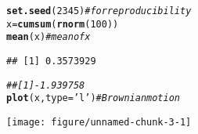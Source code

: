 \documentclass[12pt,ngerman]{scrartcl}\usepackage[]{graphicx}\usepackage[]{xcolor}
\makeatletter
\def\maxwidth{ %
  \ifdim\Gin@nat@width>\linewidth
    \linewidth
  \else
    \Gin@nat@width
  \fi
}
\newcommand{\hlnum}[1]{\textcolor[rgb]{0.686,0.059,0.569}{#1}}%
\newcommand{\hlstr}[1]{\textcolor[rgb]{0.192,0.494,0.8}{#1}}%
\newcommand{\hlcom}[1]{\textcolor[rgb]{0.678,0.584,0.686}{\textit{#1}}}%
\newcommand{\hlstd}[1]{\textcolor[rgb]{0.345,0.345,0.345}{#1}}%
\newcommand{\hlkwb}[1]{\textcolor[rgb]{0.69,0.353,0.396}{#1}}%
\newcommand{\hlkwc}[1]{\textcolor[rgb]{0.333,0.667,0.333}{#1}}%
\newcommand{\hlkwd}[1]{\textcolor[rgb]{0.737,0.353,0.396}{\textbf{#1}}}%
\newenvironment{kframe}{%
 \def\at@end@of@kframe{}%
 \ifinner\ifhmode%
  \def\at@end@of@kframe{\end{minipage}}%
  \begin{minipage}{\columnwidth}%
 \fi\fi%
 \def\FrameCommand##1{\hskip\@totalleftmargin \hskip-\fboxsep
 \colorbox{shadecolor}{##1}\hskip-\fboxsep
     \hskip-\linewidth \hskip-\@totalleftmargin \hskip\columnwidth}%
 \MakeFramed {\advance\hsize-\width
   \@totalleftmargin\z@ \linewidth\hsize
   \@setminipage}}%
 {\par\unskip\endMakeFramed%
 \at@end@of@kframe}
\newenvironment{knitrout}{}{} %
\makeatother
\begin{document}
\begin{knitrout}
\color{fgcolor}\begin{kframe}
\begin{alltt}
\hlkwd{set.seed}\hlstd{(}\hlnum{2345}\hlstd{)}  \hlcom{# for reproducibility}
\hlstd{x} \hlkwb{=} \hlkwd{cumsum}\hlstd{(}\hlkwd{rnorm}\hlstd{(}\hlnum{100}\hlstd{))}
\hlkwd{mean}\hlstd{(x)}  \hlcom{# mean of x}
\end{alltt}
\begin{verbatim}
## [1] 0.3573929
\end{verbatim}
\begin{alltt}
\hlcom{## [1] -1.939758}
\hlkwd{plot}\hlstd{(x,} \hlkwc{type} \hlstd{=} \hlstr{'l'}\hlstd{)}  \hlcom{# Brownian motion}
\end{alltt}
\end{kframe}
\texttt{[image: figure/unnamed-chunk-3-1]} 
\end{knitrout}
\end{document}
